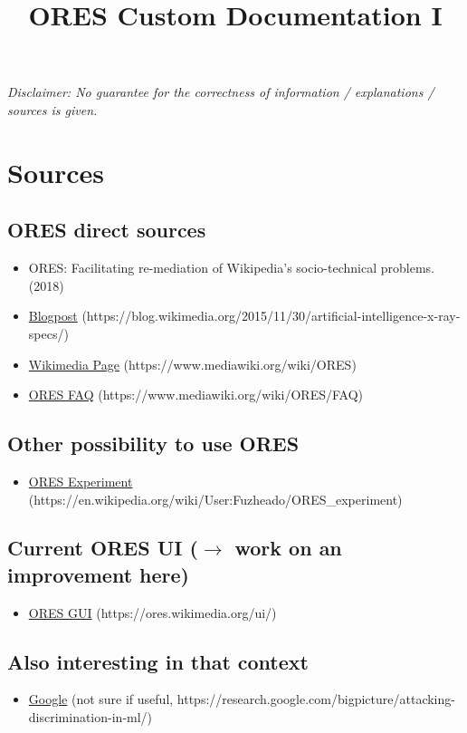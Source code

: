 \documentclass[12pt,a4paper]{article}
\title{ORES Custom Documentation I}
\date{}
\begin{document}
\maketitle
\textit{Disclaimer: No guarantee for the correctness of information / explanations / sources is given.}
\section{Sources}
\subsection{ORES direct sources}
\begin{itemize}
\item ORES: Facilitating re-mediation of Wikipedia’s socio-technical problems. 
(2018)
\item \href{https://blog.wikimedia.org/2015/11/30/artificial-intelligence-x-ray-specs/}{Blogpost} (https://blog.wikimedia.org/2015/11/30/artificial-intelligence-x-ray-specs/)
\item \href{https://www.mediawiki.org/wiki/ORES}{Wikimedia Page} (https://www.mediawiki.org/wiki/ORES)
\item \href{https://www.mediawiki.org/wiki/ORES/FAQ}{ORES FAQ} (https://www.mediawiki.org/wiki/ORES/FAQ)
\end{itemize}
\subsection{Other possibility to use ORES}
\begin{itemize}
\item \href{https://en.wikipedia.org/wiki/User:Fuzheado/ORES_experiment}{ORES Experiment} (https://en.wikipedia.org/wiki/User:Fuzheado/ORES\_experiment)
\end{itemize}
\subsection{Current ORES UI (\(\rightarrow\) work on an improvement here)}
\begin{itemize}
\item \href{https://ores.wikimedia.org/ui/}{ORES GUI} (https://ores.wikimedia.org/ui/)
\end{itemize}
\subsection{Also interesting in that context}
\begin{itemize}
\item \href{https://research.google.com/bigpicture/attacking-discrimination-in-ml/}{Google} (not sure if useful, https://research.google.com/bigpicture/attacking-discrimination-in-ml/)
\end{itemize}
\end{document}
